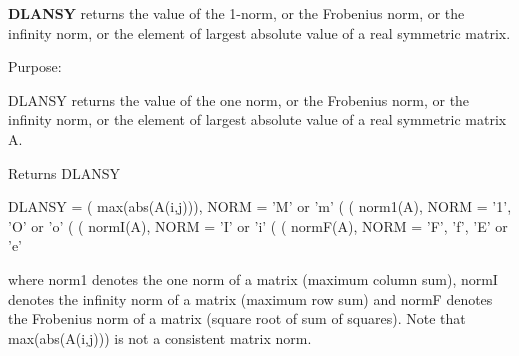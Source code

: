 {\bfseries D\+L\+A\+N\+S\+Y} returns the value of the 1-\/norm, or the Frobenius norm, or the infinity norm, or the element of largest absolute value of a real symmetric matrix. 

 \begin{DoxyParagraph}{Purpose\+: }
\begin{DoxyVerb} DLANSY  returns the value of the one norm,  or the Frobenius norm, or
 the  infinity norm,  or the  element of  largest absolute value  of a
 real symmetric matrix A.\end{DoxyVerb}

\end{DoxyParagraph}
\begin{DoxyReturn}{Returns}
D\+L\+A\+N\+S\+Y \begin{DoxyVerb}    DLANSY = ( max(abs(A(i,j))), NORM = 'M' or 'm'
             (
             ( norm1(A),         NORM = '1', 'O' or 'o'
             (
             ( normI(A),         NORM = 'I' or 'i'
             (
             ( normF(A),         NORM = 'F', 'f', 'E' or 'e'

 where  norm1  denotes the  one norm of a matrix (maximum column sum),
 normI  denotes the  infinity norm  of a matrix  (maximum row sum) and
 normF  denotes the  Frobenius norm of a matrix (square root of sum of
 squares).  Note that  max(abs(A(i,j)))  is not a consistent matrix norm.\end{DoxyVerb}
 
\end{DoxyReturn}

